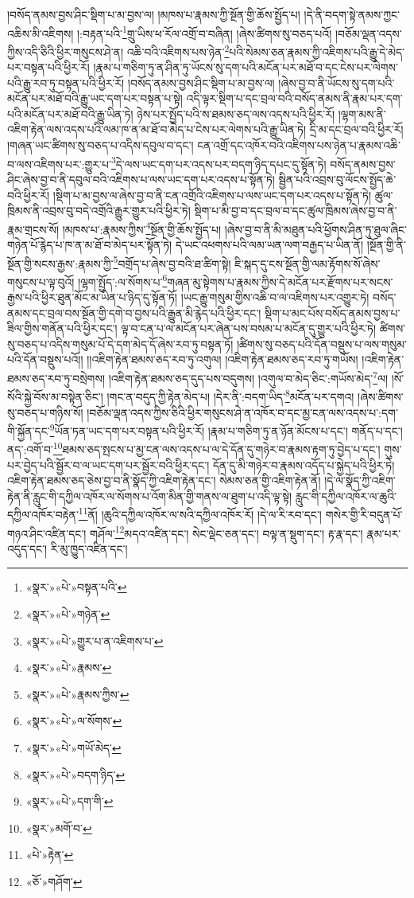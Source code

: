 །བསོད་ནམས་བྱས་ཤིང་སྡིག་པ་མ་བྱས་ལ། །མཁས་པ་རྣམས་ཀྱི་སྔོན་གྱི་ཆོས་སྤྱོད་པ། །དེ་ནི་བདག་སྟེ་ནམས་ཀྱང་འཆིས་མི་འཇིགས། །:བརྟན་པའི་\footnote{«སྣར་»«པེ་»བསྟན་པའི་}གྲུ་ཡིས་ཕ་རོལ་འགྲོ་བ་བཞིན། །ཞེས་ཚིགས་སུ་བཅད་པའོ། །བཅོམ་ལྡན་འདས་ཀྱིས་འདི་ཅིའི་ཕྱིར་གསུངས་ཤེ་ན། འཆི་བའི་འཇིགས་པས་ཉེན་\footnote{«སྣར་»«པེ་»གཉེན་}པའི་སེམས་ཅན་རྣམས་ཀྱི་འཇིགས་པའི་རྒྱུ་དེ་མེད་པར་བསྟན་པའི་ཕྱིར་རོ། །རྣམ་པ་གཅིག་ཏུ་ན་ཤིན་ཏུ་ཡོངས་སུ་དག་པའི་མངོན་པར་མཐོ་བ་དང་ངེས་པར་ལེགས་པའི་རྒྱུ་རབ་ཏུ་བསྟན་པའི་ཕྱིར་རོ། །བསོད་ནམས་བྱས་ཤིང་སྡིག་པ་མ་བྱས་ལ། །ཞེས་བྱ་བ་ནི་ཡོངས་སུ་དག་པའི་མངོན་པར་མཐོ་བའི་རྒྱུ་ཡང་དག་པར་བསྟན་པ་སྟེ། འདི་ལྟར་སྡིག་པ་དང་བྲལ་བའི་བསོད་ནམས་ནི་རྣམ་པར་དག་པའི་མངོན་པར་མཐོ་བའི་རྒྱུ་ཡིན་ཏེ། ཉེས་པར་སྤྱོད་པའི་ས་ཐམས་ཅད་ལས་འདས་པའི་ཕྱིར་རོ། །ལྷག་མས་ནི་འཇིག་རྟེན་ལས་འདས་པའི་ལམ་ཁ་ན་མ་ཐོ་བ་མེད་པ་ངེས་པར་ལེགས་པའི་རྒྱུ་ཡིན་ཏེ། དྲི་མ་དང་བྲལ་བའི་ཕྱིར་རོ། །གཞན་ཡང་ཚིགས་སུ་བཅད་པ་འདིས་དབུལ་བ་དང་། ངན་འགྲོ་དང་འཁོར་བའི་འཇིགས་པས་ཉེན་པ་རྣམས་འཆི་བ་ལས་འཇིགས་པར་:གྱུར་པ་\footnote{«སྣར་»«པེ་»གྱུར་པ་ན་འཇིགས་པ་}དེ་ལས་ཡང་དག་པར་འདས་པར་བདག་ཉིད་དཔང་དུ་སྟོན་ཏེ། བསོད་ནམས་བྱས་ཤིང་ཞེས་བྱ་བ་ནི་དབུལ་བའི་འཇིགས་པ་ལས་ཡང་དག་པར་འདས་པ་སྟོན་ཏེ། སྦྱིན་པའི་འབྲས་བུ་ལོངས་སྤྱོད་ཆེ་བའི་ཕྱིར་རོ། །སྡིག་པ་མ་བྱས་ལ་ཞེས་བྱ་བ་ནི་ངན་འགྲོའི་འཇིགས་པ་ལས་ཡང་དག་པར་འདས་པ་སྟོན་ཏེ། ཚུལ་ཁྲིམས་ནི་འབྲས་བུ་བདེ་འགྲོའི་རྒྱུར་གྱུར་པའི་ཕྱིར་ཏེ། སྡིག་པ་མི་བྱ་བ་དང་བྲལ་བ་དང་ཚུལ་ཁྲིམས་ཞེས་བྱ་བ་ནི་རྣམ་གྲངས་སོ། །མཁས་པ་:རྣམས་ཀྱིས་\footnote{«སྣར་»«པེ་»རྣམས་}སྔོན་གྱི་ཆོས་སྤྱོད་པ། །ཞེས་བྱ་བ་ནི་མི་མཐུན་པའི་ཕྱོགས་ཤིན་ཏུ་ཐུལ་ཞིང་གཉེན་པོ་རྙེད་པ་ཁ་ན་མ་ཐོ་བ་མེད་པར་སྟོན་ཏེ། དེ་ཡང་འཕགས་པའི་ལམ་ཡན་ལག་བརྒྱད་པ་ཡིན་ནོ། །སྔོན་གྱི་ནི་སྔོན་གྱི་སངས་རྒྱས་:རྣམས་ཀྱི་\footnote{«སྣར་»«པེ་»རྣམས་ཀྱིས་}བགྲོད་པ་ཞེས་བྱ་བའི་ཐ་ཚིག་སྟེ། ཇི་སྐད་དུ་ངས་སྔོན་གྱི་ལམ་རྟོགས་སོ་ཞེས་གསུངས་པ་ལྟ་བུའོ། །ལྷག་སྤྱོད་:ལ་སོགས་པ་\footnote{«སྣར་»«པེ་»ལ་སོགས་}གཞན་མུ་སྟེགས་པ་རྣམས་ཀྱིས་དེ་མངོན་པར་རྫོགས་པར་སངས་རྒྱས་པའི་ཕྱིར་ཐུན་མོང་མ་ཡིན་པ་ཉིད་དུ་སྟོན་ཏོ། །ཡང་རྒྱུ་གསུམ་གྱིས་འཆི་བ་ལ་འཇིགས་པར་འགྱུར་ཏེ། བསོད་ནམས་དང་བྲལ་བས་སྔོན་གྱི་དགེ་བ་བྱས་པའི་རྒྱུན་མི་རྙེད་པའི་ཕྱིར་དང་། སྡིག་པ་མང་པོས་བསོད་ནམས་བྱས་པ་ཟིལ་གྱིས་གནོན་པའི་ཕྱིར་དང་། ལྟ་བ་ངན་པ་ལ་མངོན་པར་ཞེན་པས་བསམ་པ་མངོན་དུ་གྱུར་པའི་ཕྱིར་ཏེ། ཚིགས་སུ་བཅད་པ་འདིས་གསུམ་པོ་དེ་དག་མེད་དོ་ཞེས་རབ་ཏུ་བསྟན་ཏོ། །ཚིགས་སུ་བཅད་པའི་དོན་བསྡུས་པ་ལས་གསུམ་པའི་དོན་བསྡུས་པའོ།། །།འཇིག་རྟེན་ཐམས་ཅད་རབ་ཏུ་འགུལ། །འཇིག་རྟེན་ཐམས་ཅད་རབ་ཏུ་གཡོས། །འཇིག་རྟེན་ཐམས་ཅད་རབ་ཏུ་བསྲེགས། །འཇིག་རྟེན་ཐམས་ཅད་དུད་པས་བདུགས། །འགུལ་བ་མེད་ཅིང་:གཡོས་མེད་\footnote{«སྣར་»«པེ་»གཡོ་མེད་}ལ། །སོ་སོའི་སྐྱེ་བོས་མ་བསྟེན་ཅིང་། །གང་ན་བདུད་ཀྱི་རྟེན་མེད་པ། །དེར་ནི་:བདག་ཡིད་\footnote{«སྣར་»«པེ་»བདག་ཉིད་}མངོན་པར་དགའ། །ཞེས་ཚིགས་སུ་བཅད་པ་གཉིས་སོ། །བཅོམ་ལྡན་འདས་ཀྱིས་ཅིའི་ཕྱིར་གསུངས་ཤེ་ན་འཁོར་བ་དང་མྱ་ངན་ལས་འདས་པ་:དག་གི་སྐྱོན་དང་\footnote{«སྣར་»«པེ་»དག་གི་}ཡོན་ཏན་ཡང་དག་པར་བསྟན་པའི་ཕྱིར་རོ། །རྣམ་པ་གཅིག་ཏུ་ན་ཉོན་མོངས་པ་དང་། གནོད་པ་དང་། ནད་:འགོ་བ་\footnote{«སྣར་»མགོ་བ་}ཐམས་ཅད་སྤངས་པ་མྱ་ངན་ལས་འདས་པ་ལ་དེ་དོན་དུ་གཉེར་བ་རྣམས་རྟག་ཏུ་བྱེད་པ་དང་། གུས་པར་བྱེད་པའི་སྦྱོར་བ་ལ་ཡང་དག་པར་སྦྱོར་བའི་ཕྱིར་དང་། དོན་དུ་མི་གཉེར་བ་རྣམས་འདོད་པ་སྐྱེད་པའི་ཕྱིར་ཏེ། འཇིག་རྟེན་ཐམས་ཅད་ཅེས་བྱ་བ་ནི་སྣོད་ཀྱི་འཇིག་རྟེན་དང་། སེམས་ཅན་གྱི་འཇིག་རྟེན་ནོ། །དེ་ལ་སྣོད་ཀྱི་འཇིག་རྟེན་ནི་རླུང་གི་དཀྱིལ་འཁོར་ལ་སོགས་པ་འོག་མིན་གྱི་གནས་ལ་ཐུག་པ་འདི་ལྟ་སྟེ། རླུང་གི་དཀྱིལ་འཁོར་ལ་ཆུའི་དཀྱིལ་འཁོར་བརྟེན་\footnote{«པེ་»རྟེན་}ནོ། །ཆུའི་དཀྱིལ་འཁོར་ལ་སའི་དཀྱིལ་འཁོར་རོ། །དེ་ལ་རི་རབ་དང་། གསེར་གྱི་རི་བདུན་པོ་གཉའ་ཤིང་འཛིན་དང་། གཤོལ་\footnote{«ཅོ་»གཤོག་}མདའ་འཛིན་དང་། སེང་ལྡེང་ཅན་དང་། བལྟ་ན་སྡུག་དང་། རྟ་རྣ་དང་། རྣམ་པར་འདུད་དང་། རི་མུ་ཁྱུད་འཛིན་དང་། 